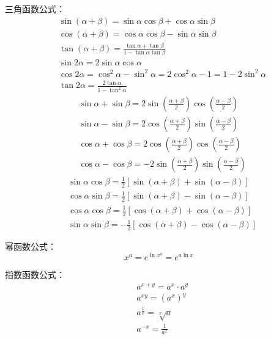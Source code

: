 三角函数公式：
\begin{align*}
&\sin \left( \alpha +\beta \right) =\sin \alpha \cos \beta +\cos \alpha \sin \beta \\
&\cos \left( \alpha +\beta \right) =\cos \alpha \cos \beta -\sin \alpha \sin \beta \\
&\tan \left( \alpha +\beta \right) =\frac{\tan \alpha +\tan \beta}{1-\tan \alpha \tan \beta} \\
&\sin 2\alpha =2\sin \alpha \cos \alpha \\
&\cos 2\alpha =\cos ^2\alpha -\sin ^2\alpha =2\cos ^2\alpha -1=1-2\sin ^2\alpha \\
&\tan 2\alpha =\frac{2\tan \alpha}{1-\tan ^2\alpha}
\end{align*}
\begin{align*}
&\sin \alpha +\sin \beta =2\sin \left( \frac{\alpha +\beta}{2} \right) \cos \left( \frac{\alpha -\beta}{2} \right) \\
&\sin \alpha -\sin \beta =2\cos \left( \frac{\alpha +\beta}{2} \right) \sin \left( \frac{\alpha -\beta}{2} \right) \\
&\cos \alpha +\cos \beta =2\cos \left( \frac{\alpha +\beta}{2} \right) \cos \left( \frac{\alpha -\beta}{2} \right) \\
&\cos \alpha -\cos \beta =-2\sin \left( \frac{\alpha +\beta}{2} \right) \sin \left( \frac{\alpha -\beta}{2} \right)
\end{align*}
\begin{align*}
&\sin \alpha \cos \beta =\frac{1}{2}\left[ \sin \left( \alpha +\beta \right) +\sin \left( \alpha -\beta \right) \right] \\
&\cos \alpha \sin \beta =\frac{1}{2}\left[ \sin \left( \alpha +\beta \right) -\sin \left( \alpha -\beta \right) \right] \\
&\cos \alpha \cos \beta =\frac{1}{2}\left[ \cos \left( \alpha +\beta \right) +\cos \left( \alpha -\beta \right) \right] \\
&\sin \alpha \sin \beta =-\frac{1}{2}\left[ \cos \left( \alpha +\beta \right) -\cos \left( \alpha -\beta \right) \right]
\end{align*}

幂函数公式：
\[
x^a=e^{\ln x^a}=e^{a\ln x}
\]

指数函数公式：
\begin{align*}
&a^{x+y}=a^x\cdot a^y \\
&a^{xy}=\left( a^x \right) ^y \\
&a^{\frac{1}{x}}=\sqrt[x]{a} \\
&a^{-x}=\frac{1}{a^x}
\end{align*}

